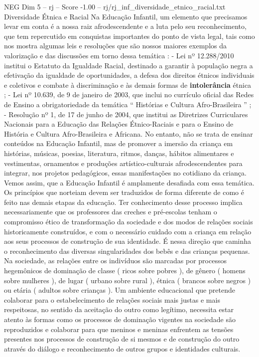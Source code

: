 \begin{textsample}{NEG Dim 5 – rj – Score -1.00 – rj/rj\_inf\_diversidade\_etnico\_racial.txt}  \label{ex:f5_neg_093}
Diversidade Étnica e Racial Na Educação Infantil, um elemento que precisamos levar em conta é a nossa raiz afrodescendente e a luta pelo seu reconhecimento, que tem repercutido em conquistas importantes do ponto de vista legal, tais como nos mostra algumas leis e resoluções que são nossos maiores exemplos da valorização e das discussões em torno dessa temática : - Lei nº 12.288/2010 institui o Estatuto da Igualdade Racial, destinado a garantir à população negra a efetivação da igualdade de oportunidades, a defesa dos direitos étnicos individuais e coletivos e combate à discriminação e às demais formas de \textbf{intolerância} étnica ; - Lei nº 10.639, de 9 de janeiro de 2003, que inclui no currículo oficial das Redes de Ensino a obrigatoriedade da temática “ Histórias e Cultura Afro-Brasileira ” ; - Resolução nº 1, de 17 de junho de 2004, que institui as Diretrizes Curriculares Nacionais para a Educação das Relações Étnico-Raciais e para o Ensino de História e Cultura Afro-Brasileira e Africana.
No entanto, não se trata de ensinar conteúdos na Educação Infantil, mas de promover a imersão da criança em histórias, músicas, poesias, literatura, ritmos, danças, hábitos alimentares e vestimentas, ornamentos e produções artístico-culturais afrodescendentes para integrar, nos projetos pedagógicos, essas manifestações no cotidiano da criança.
Vemos assim, que a Educação Infantil é amplamente desafiada com essa temática.
Os princípios que norteiam devem ser traduzidos de forma diferente de como é feito nas demais etapas da educação.
Ter conhecimento desse processo implica necessariamente que os professores das creches e pré-escolas tenham o compromisso ético de transformação da sociedade e dos modos de relações sociais historicamente construídos, e com o necessário cuidado com a criança em relação aos seus processos de construção de sua identidade.
É nessa direção que caminha o reconhecimento das diversas singularidades dos bebês e das crianças pequenas.
Na sociedade, as relações entre os indivíduos são marcadas por processos hegemônicos de dominação de classe ( ricos sobre pobres ), de gênero ( homens sobre mulheres ), de lugar ( urbano sobre rural ), étnica ( brancos sobre negros ) ou etária ( adultos sobre crianças ).
Um ambiente educacional que pretende colaborar para o estabelecimento de relações sociais mais justas e mais respeitosas, no sentido da aceitação do outro como legítimo, necessita estar atento às formas como os processos de dominação vigentes na sociedade são reproduzidos e colaborar para que meninos e meninas enfrentem as tensões presentes nos processos de construção de si mesmos e de construção do outro através do diálogo e reconhecimento de outros grupos e identidades culturais.

\end{textsample}
